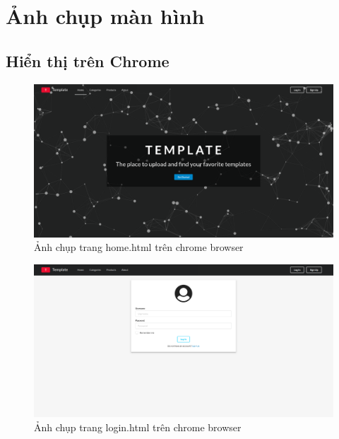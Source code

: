 \documentclass[a4paper]{article}
\begin{document}
\newpage
\section{Ảnh chụp màn hình}
\subsection{Hiển thị trên Chrome}

\begin{figure}[H]
\begin{center}
\includegraphics[page=1, scale=0.215]{screenshot/chrome1.png}
\caption{Ảnh chụp trang home.html trên chrome browser}
\end{center}
\end{figure}

\begin{figure}[H]
\begin{center}
\includegraphics[page=1, scale=0.215]{screenshot/chrome2.png}
\caption{Ảnh chụp trang login.html trên chrome browser}
\end{center}
\end{figure}
\end{document}

